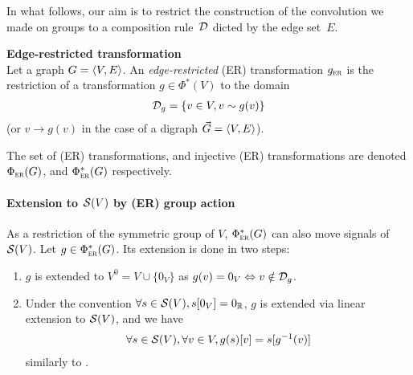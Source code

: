 


In what follows, our aim is to restrict the construction of the convolution we made on groups to a composition rule~$\mathcal{D}$ dicted by the edge set~$E$.

\begin{definition}\textbf{Edge-restricted transformation}\\
Let a graph $G = \langle V, E \rangle$. An \emph{edge-restricted} (ER) transformation $g_{\operatorname{\textsc{er}}}$ is the restriction of a transformation $g \in \Phi^*(V)$ to the domain
\begin{gather*}
\mathcal{D}_g = \{v \in V, v \sim g(v)\}
\end{gather*}
(or $v \rightarrow g(v)$ in the case of a digraph $\vec{G} = \langle V, E \rangle$).
\end{definition}

The set of (ER) transformations, and injective (ER) transformations are denoted $\Phi_{\operatorname{\textsc{er}}}(G)$, and $\Phi_{\operatorname{\textsc{er}}}^*(G)$ respectively.

\paragraph{Extension to $\mathcal{S}(V)$ by (ER) group action}
As a restriction of the symmetric group of $V$, $\Phi_{\operatorname{\textsc{er}}}^*(G)$ can also move signals of $\mathcal{S}(V)$. Let $g \in \Phi_{\operatorname{\textsc{er}}}^*(G)$. Its extension is done in two steps:
\begin{enumerate}
  \item $g$ is extended to $V^0 = V \cup \{0_V\}$ as $g(v) = 0_V \Leftrightarrow v \notin \mathcal{D}_g$.
  \item Under the convention $\forall s \in \mathcal{S}(V), s[0_V] = 0_{\mathbb{R}}$, $g$ is extended via linear extension to $\mathcal{S}(V)$, and we have
  \begin{gather*}
  \forall s \in \mathcal{S}(V), \forall v \in V, g(s)[v] = s[g^{-1}(v)]
  \end{gather*}
  similarly to .
\end{enumerate}

